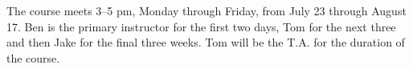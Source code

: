 The course meets 3--5 pm, Monday through Friday, from July 23 through August 17. Ben is the primary instructor for the first two days, Tom for the next three and then Jake for the final three weeks. Tom will be the T.A. for the duration of the course.


